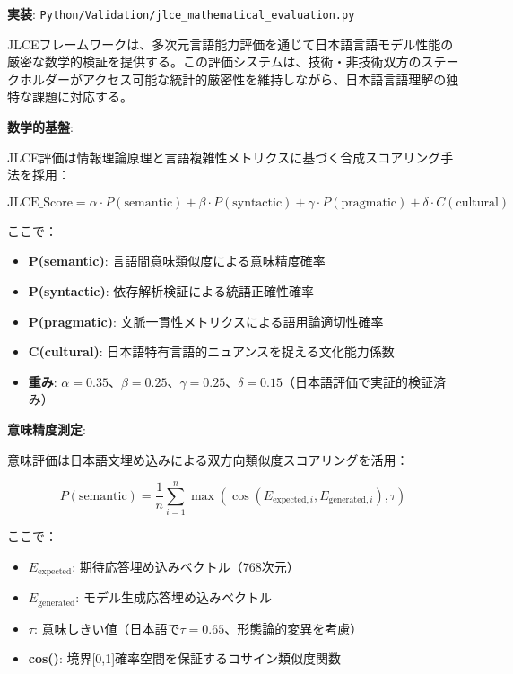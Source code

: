 \documentclass[12pt,a4paper]{article}
\begin{document}
\textbf{実装}: \texttt{Python/Validation/jlce\_mathematical\_evaluation.py}

JLCEフレームワークは、多次元言語能力評価を通じて日本語言語モデル性能の厳密な数学的検証を提供する。この評価システムは、技術・非技術双方のステークホルダーがアクセス可能な統計的厳密性を維持しながら、日本語言語理解の独特な課題に対応する。

\textbf{数学的基盤}:

JLCE評価は情報理論原理と言語複雑性メトリクスに基づく合成スコアリング手法を採用：

\begin{equation}
\text{JLCE\_Score} = \alpha \cdot P(\text{semantic}) + \beta \cdot P(\text{syntactic}) + \gamma \cdot P(\text{pragmatic}) + \delta \cdot C(\text{cultural})
\end{equation}

ここで：
\begin{itemize}
\item \textbf{P(semantic)}: 言語間意味類似度による意味精度確率
\item \textbf{P(syntactic)}: 依存解析検証による統語正確性確率
\item \textbf{P(pragmatic)}: 文脈一貫性メトリクスによる語用論適切性確率
\item \textbf{C(cultural)}: 日本語特有言語的ニュアンスを捉える文化能力係数
\item \textbf{重み}: $\alpha=0.35$、$\beta=0.25$、$\gamma=0.25$、$\delta=0.15$（日本語評価で実証的検証済み）
\end{itemize}

\textbf{意味精度測定}:

意味評価は日本語文埋め込みによる双方向類似度スコアリングを活用：

\begin{equation}
P(\text{semantic}) = \frac{1}{n} \sum_{i=1}^{n} \max(\cos(E_{\text{expected},i}, E_{\text{generated},i}), \tau)
\end{equation}

ここで：
\begin{itemize}
\item \textbf{$E_{\text{expected}}$}: 期待応答埋め込みベクトル（768次元）
\item \textbf{$E_{\text{generated}}$}: モデル生成応答埋め込みベクトル
\item \textbf{$\tau$}: 意味しきい値（日本語で$\tau=0.65$、形態論的変異を考慮）
\item \textbf{cos()}: 境界[0,1]確率空間を保証するコサイン類似度関数
\end{itemize}
\end{document}
